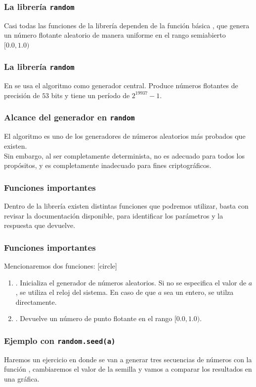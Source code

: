 \begin{frame}
\frametitle{La librería \texttt{random}}
Casi todas las funciones de la librería dependen de la función básica , que genera un número flotante aleatorio de manera uniforme en el rango semiabierto $[0.0, 1.0)$
\end{frame}
\begin{frame}
\frametitle{La librería \texttt{random}}
En \python{} se usa el algoritmo  como generador central. Produce números flotantes de precisión de $53$ bits y tiene un período de $2^{19937}-1$.
\end{frame}
\begin{frame}
\frametitle{Alcance del generador en \texttt{random}}
El algoritmo  es uno de los generadores de números aleatorios más probados que existen.
\\
\bigskip
Sin embargo, al ser completamente determinista, no es adecuado para todos los propósitos, y es completamente inadecuado para fines criptográficos.
\end{frame}
\begin{frame}
\frametitle{Funciones importantes}
Dentro de la librería  existen distintas funciones que podremos utilizar, basta con revisar la documentación disponible, para identificar los parámetros y la respuesta que devuelve.
\end{frame}
\begin{frame}
\frametitle{Funciones importantes}
Mencionaremos dos funciones:
[circle]
\begin{enumerate}[<+->]
\item {}. Inicializa el generador de números aleatorios. Si no se especifica el valor de $a$, se utiliza el reloj del sistema. En caso de que $a$ sea un entero, se utilza directamente.
\item {}. Devuelve un número de punto flotante en el rango $[0.0, 1.0)$.
\end{enumerate}
\end{frame}
\begin{frame}
\frametitle{Ejemplo con \texttt{random.seed(a)}}
Haremos un ejercicio en donde se van a generar tres secuencias de números con la función , cambiaremos el valor de la semilla y vamos a comparar los resultados en una gráfica.
\end{frame}
